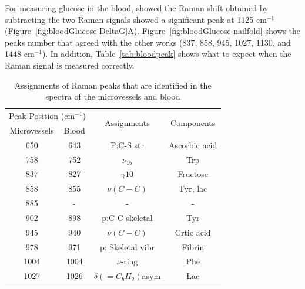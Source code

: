 For measuring glucose in the blood, \cite{directGlucose} showed the Raman shift obtained by subtracting the two Raman signals showed a significant peak at 1125 $\text{cm}^{-1}$ (Figure~\ref{fig:bloodGlucose-DeltaG}A).
Figure~\ref{fig:bloodGlucose-nailfold} shows the peaks number that agreed with the other works (837, 858, 945, 1027, 1130, and 1448 $\text{cm}^{-1}$). 
In addition, Table~\ref{tab:bloodpeak} shows what to expect when the Raman signal is measured correctly.

\begin{table}[]
    \caption{Assignments of Raman peaks that are identified in the spectra of the microvessels and blood \citep{peak45,forearm2005,peak47,peak48}}
    \begin{center}
    \begin{tabular}{cccc}
    \hline
    \multicolumn{2}{l}{Peak Position ($\text{cm}^{-1}$)} & \multirow{2}{*}{Assignments}  & \multirow{2}{*}{Components} \\ \cline{1-2}
    Microvessels         & Blood         &                               &                             \\ \cline{1-2}
    \hline
    650                  & 643           & P:C-S str                     & Ascorbic acid               \\
    758                  & 752           & $\nu_{15}$                    & Trp                         \\
    837                  & 827           & $\gamma10$                    & Fructose                    \\
    858                  & 855           & $\nu(C-C)$                    & Tyr, lac                    \\
    885                  & -             & -                             & -                           \\
    902                  & 898           & p:C-C skeletal                & Tyr                         \\
    945                  & 940           & $\nu(C-C)$                    & Crtic acid                  \\
    978                  & 971           & p: Skeletal vibr              & Fibrin                      \\
    1004                 & 1004          & $\nu$-ring                    & Phe                         \\
    1027                 & 1026          & $\delta(={C}_{b}{H}_{2})$asym & Lac                         \\

\end{tabular}
\end{center}
\end{table}
